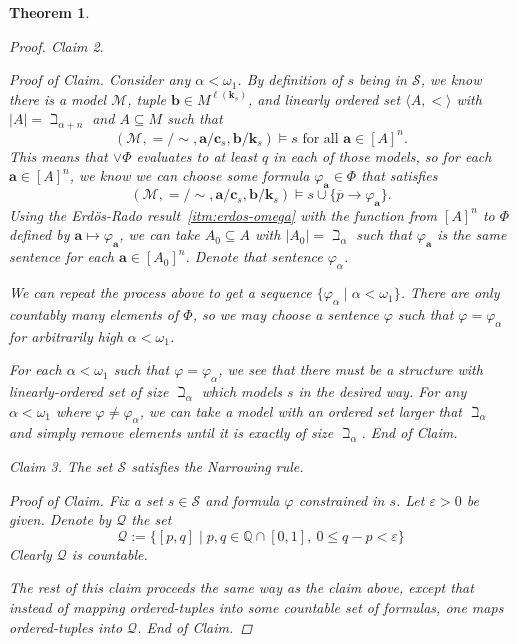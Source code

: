\documentclass{amsart}
\newtheorem{theorem}{Theorem}[section]
\theoremstyle{definition}
\numberwithin{equation}{theorem}
\renewcommand{\phi}{\varphi}
\renewcommand{\epsilon}{\varepsilon}
\newcommand{\Q}{\mathbb{Q}}
\newcommand{\V}{\mathbf}
\newcommand{\where}{\mid}
\newcommand{\unvee}{{\vee}}
\newcommand{\rat}[1]{{\overline{#1}}}
\newcommand{\narrow}[1]{\xrightarrow{#1}}
\renewcommand{\to}{\narrow{}}
\newcommand{\len}{\ell}
\newenvironment{claim}[1]{\vspace{.07in}\par\noindent\emph{Claim #1.}\space}{}
\newenvironment{claimproof}{\vspace{.07in}\par\noindent\emph{Proof of Claim.}\space}{\hfill \emph{End of Claim.}}
\begin{document}
\begin{theorem}
\begin{proof}
\begin{claim}{2}
\begin{claimproof}
        Consider any $\alpha<\omega_1$.
        By definition of $s$ being in $\mathscr{S}$, we know there is a model $\mathcal M$, tuple $\V b\in M^{\len(\V k_s)}$, and linearly ordered set $\langle A,<\rangle$ with $|A|=\beth_{\alpha+n}$ and $A\subseteq M$ such that
        \[
		      (\mathcal M,{=}/{\sim},\V a/\V c_s, \V b/\V k_s)\models s\text{ for all $\V a\in[A]^n$}.
		    \]
		    This means that $\unvee\Phi$ evaluates to at least $q$ in each of those models, so for each $\V a\in[A]^n$, we know we can choose some formula $\phi_{\V a}\in\Phi$ that satisfies
		    \[
		      (\mathcal M,{=}/{\sim},\V a/\V c_s, \V b/\V k_s)\models s\cup\{\rat p\to\phi_{\V a}\}.
		    \]
		    Using the Erd\"os-Rado result~\ref{itm:erdos-omega} with the function from $[A]^n$ to $\Phi$ defined by $\V a\mapsto \phi_{\V a}$, we can take $A_0\subseteq A$ with $|A_0|=\beth_\alpha$ such that $\phi_{\V a}$ is the same sentence for each $\V a\in[A_0]^n$.
		    Denote that sentence $\phi_\alpha$.
		    
		    We can repeat the process above to get a sequence $\{\phi_\alpha\where \alpha<\omega_1\}$.
		    There are only countably many elements of $\Phi$, so we may choose a sentence $\phi$ such that $\phi=\phi_\alpha$ for arbitrarily high $\alpha<\omega_1$.
		    
		    For each $\alpha<\omega_1$ such that $\phi=\phi_\alpha$, we see that there must be a structure with linearly-ordered set of size $\beth_\alpha$ which models $s$ in the desired way.
		    For any $\alpha<\omega_1$ where $\phi\neq\phi_\alpha$, we can take a model with an ordered set larger that $\beth_\alpha$ and simply remove elements until it is exactly of size $\beth_\alpha$.
      \end{claimproof}
    \end{claim}
    \begin{claim}{3}
      The set $\mathscr{S}$ satisfies the Narrowing rule.
      \begin{claimproof}
         Fix a set $s\in \mathscr{S}$ and formula $\phi$ constrained in $s$.
         Let $\epsilon>0$ be given.
         Denote by $\mathcal Q$ the set
         \[
           \mathcal Q:=\{[p,q]\where p,q\in\Q\cap[0,1],\ 0\leq q-p<\epsilon\}
         \]
         Clearly $\mathcal Q$ is countable.
         
         The rest of this claim proceeds the same way as the claim above, except that instead of mapping ordered-tuples into some countable set of formulas, one maps ordered-tuples into $\mathcal Q$.
      \end{claimproof}
    \end{claim}
    

\end{proof}
\end{theorem}
\end{document}
